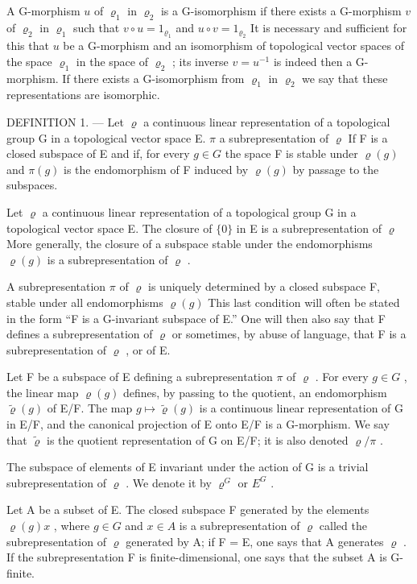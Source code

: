 A G-morphism \(u\) of \(\varrho_{1}\) in \(\varrho_{2}\) is a G-isomorphism if there exists a G-morphism \(v\) of \(\varrho_{2}\) in \(\varrho_{1}\) such that \(v\circ u=1_{\varrho_{1}}\) and \(u\circ v=1_{\varrho_{2}}\) It is necessary and sufficient for this that \(u\) be a G-morphism and an isomorphism of topological vector spaces of the space \(\varrho_{1}\) in the space of \(\varrho_{2}\) ; its inverse \(v=u^{-1}\) is indeed then a G-morphism. If there exists a G-isomorphism from \(\varrho_{1}\) in \(\varrho_{2}\) we say that these representations are isomorphic.

DEFINITION 1. --- Let \(\varrho\) a continuous linear representation of a topological group G in a topological vector space E. \(\pi\) a subrepresentation of \(\varrho\) If F is a closed subspace of E and if, for every \(g \in G\) the space F is stable under \(\varrho(g)\) and \(\pi(g)\) is the endomorphism of F induced by \(\varrho(g)\) by passage to the subspaces.

Let \(\varrho\) a continuous linear representation of a topological group G in a topological vector space E. The closure of \(\{0\}\) in E is a subrepresentation of \(\varrho\) More generally, the closure of a subspace stable under the endomorphisms \(\varrho(g)\) is a subrepresentation of \(\varrho\) .

A subrepresentation \(\pi\) of \(\varrho\) is uniquely determined by a closed subspace F, stable under all endomorphisms \(\varrho(g)\) This last condition will often be stated in the form “F is a G-invariant subspace of E.” One will then also say that F defines a subrepresentation of \(\varrho\) or sometimes, by abuse of language, that F is a subrepresentation of \(\varrho\) , or of E.

Let F be a subspace of E defining a subrepresentation \(\pi\) of \(\varrho\) . For every \(g \in G\) , the linear map \(\varrho(g)\) defines, by passing to the quotient, an endomorphism \(\widetilde{\varrho}(g)\) of E/F. The map \(g \mapsto \widetilde{\varrho}(g)\) is a continuous linear representation of G in E/F, and the canonical projection of E onto E/F is a G-morphism. We say that \(\widetilde{\varrho}\) is the quotient representation of G on E/F; it is also denoted \(\varrho/\pi\) .

The subspace of elements of E invariant under the action of G is a trivial subrepresentation of \(\varrho\) . We denote it by \(\varrho^{G}\) or \(E^{G}\) .

Let A be a subset of E. The closed subspace F generated by the elements \(\varrho(g)x\) , where \(g \in G\) and \(x \in A\) is a subrepresentation of \(\varrho\) called the subrepresentation of \(\varrho\) generated by A; if F = E, one says that A generates \(\varrho\) . If the subrepresentation F is finite-dimensional, one says that the subset A is G-finite.

